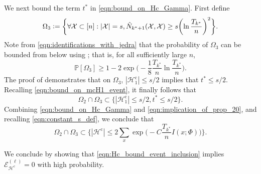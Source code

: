 \documentclass[11pt]{article}
\newcommand{\eqdef}{\vcentcolon=}
\newcommand{\mcE}{\mathcal{E}}
\newcommand{\mcH}{\mathcal{H}}
\newcommand{\mcX}{\mathcal{X}}
\newcommand{\mbbP}{\mathbb{P}}
\theoremstyle{definition}
\theoremstyle{definition}
\begin{document}
We next bound the term $t^*$ in \eqref{eqn:bound_on_Hc_Gamma}.
First define
\begin{equation}
	\Omega_3\eqdef \biggl\{\forall \mcX\subset[n]: |\mcX|=s, \hat{N}_{k^*+1}(\mcX,\mcX)\geq s\biggl(\ln\frac{T_{k^*}}{n}\biggr)^2\biggr\}.
\end{equation}
Note from \eqref{eqn:identifications_with_jedra} that the probability of $\Omega_3$ can be bounded from below using \cite[Lemma 20]{Jedra:2022}; that is, for all sufficiently large $n$,
\begin{equation}
	\label{eqn:bound_from_lemma_20}
	\mbbP[\Omega_3]
	\geq
	1-2\exp\biggl(-\frac{1}{8}\frac{T_{k^*}}{n}\ln\frac{T_{k^*}}{n}\biggr)
	.
\end{equation}
The proof of \cite[Proposition 20]{Jedra:2022} demonstrates that on $\Omega_3$, $|\mcH_1^{\mathrm{c}}|\leq s/2$ implies that $t^*\leq s/2$.
Recalling \eqref{eqn:bound_on_mcH1_event}, it finally follows that
\begin{equation}
	\label{eqn:implication_of_prop_20}
	\Omega_2\cap\Omega_3
	\subset
	\{|\mcH_1^{\mathrm{c}}|\leq s/2, t^*\leq s/2\}
	.
\end{equation}
Combining \eqref{eqn:bound_on_Hc_Gamma} and \eqref{eqn:implication_of_prop_20}, and recalling \eqref{eqn:constant_s_def}, we conclude that
\begin{equation}
	\label{eqn:Hc_bound_event_inclusion}
	\Omega_2\cap\Omega_3
	\subset
	\biggl\{|\mcH^{\mathrm{c}}|\leq 2\sum_x\exp\biggl(-C\frac{T_{k^*}}{n}I(x;\Phi)\biggr)\biggr\}
	.
\end{equation}

We conclude by showing that \eqref{eqn:Hc_bound_event_inclusion} implies $\mcE_{\mcH^{\mathrm{c}}}^{(\ell)}=0$ with high probability.
\end{document}
